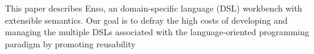 
This paper describes Enso, an domain-specific language (DSL) workbench with extensible semantics. Our goal is to defray the high costs of developing and managing the multiple DSLs associated with the language-oriented programming paradigm by promoting reusability


